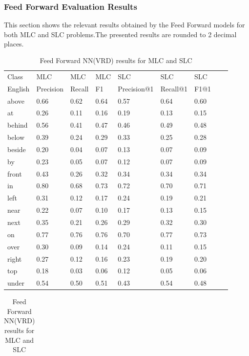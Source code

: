 \documentclass{csfyp}
\begin{document}
\subsubsection{Feed Forward Evaluation Results}
This section shows the relevant results obtained by the Feed Forward models for both MLC and SLC problems.The presented results are rounded to 2 decimal places.

\begin{table}[!htbp]
\centering
\begin{tabular}{|l|l|l|l|l|l|l|l|l}
\cline{1-7}
Class &  MLC  &  MLC  &  MLC & SLC &  SLC & SLC \\ \cline{1-7}
English & Precision &  Recall    & F1 & Precision@1 & Recall@1 & F1@1 \\ \cline{1-7}
above	&	0.66	&	0.62	&	0.64	&	0.57	&	0.64	&	0.60 \\ \cline{1-7}
at	    &	0.26	&	0.11	&	0.16	&	0.19	&	0.13	&	0.15 \\ \cline{1-7} 
behind	&	0.56	&	0.41	&	0.47	&	0.46	&	0.49	&	0.48 \\ \cline{1-7} 
below	&	0.39	&	0.24	&	0.29	&	0.33	&	0.25	&	0.28 \\ \cline{1-7} 
beside	&	0.20	&	0.04	&	0.07	&	0.13	&	0.07	&	0.09 \\ \cline{1-7} 
by 	    &	0.23	&	0.05	&	0.07	&	0.12	&	0.07	&	0.09 \\ \cline{1-7} 
front	&	0.43	&	0.26	&	0.32	&	0.34	&	0.34	&	0.34 \\ \cline{1-7} 
in   	&	0.80	&	0.68	&	0.73	&	0.72	&	0.70	&	0.71 \\ \cline{1-7} 
left	&	0.31	&	0.12	&	0.17	&	0.24	&	0.19	&	0.21 \\ \cline{1-7} 
near	&	0.22	&	0.07	&	0.10	&	0.17	&	0.13	&	0.15 \\ \cline{1-7}
next	&	0.35	&	0.21	&	0.26	&	0.29	&	0.32	&	0.30 \\ \cline{1-7} 
on	    &	0.77	&	0.76	&	0.76	&	0.70	&	0.77	&	0.73 \\ \cline{1-7} 
over	&	0.30	&	0.09	&	0.14	&	0.24	&	0.11	&	0.15 \\ \cline{1-7} 
right	&	0.27	&	0.12	&	0.16	&	0.23	&	0.19	&	0.20 \\ \cline{1-7} 
top	    &	0.18	&	0.03	&	0.06	&	0.12	&	0.05	&	0.06 \\ \cline{1-7} 
under	&	0.54	&	0.50	&	0.51	&	0.43	&	0.54	&	0.48 \\ \cline{1-7}
\end{tabular}
\caption{Feed Forward NN(VRD) results for MLC and SLC}
\centering
\begin{tabular}{|l|l|l|l|l|l|l|l|l}

\end{tabular}
\end{table}
\end{document}
